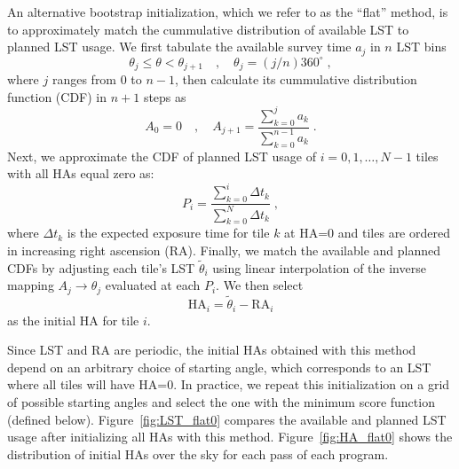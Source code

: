 \documentclass[12pt]{article}
\providecommand{\fig}[1]{Figure~\ref{fig:#1}}
\begin{document}
An alternative bootstrap initialization, which we refer to as the ``flat'' method, is to approximately match the cummulative distribution of available LST to planned LST usage. We first tabulate the available survey time $a_j$ in $n$ LST bins
$$
\theta_j \le \theta < \theta_{j+1} \quad , \quad \theta_j = (j/n) 360^\circ \; ,
$$
where $j$ ranges from $0$ to $n-1$, then calculate its cummulative distribution function (CDF) in $n+1$ steps as
$$
A_0 = 0 \quad , \quad
A_{j+1} = \frac{\sum_{k=0}^{j} a_k}{\sum_{k=0}^{n-1} a_k} \; .
$$
Next, we approximate the CDF of planned LST usage of $i = 0, 1, \ldots, N-1$ tiles with all HAs equal zero as:
$$
P_i = \frac{\sum_{k=0}^{i} \Delta t_k}{\sum_{k=0}^N \Delta t_k} \; ,
$$
where $\Delta t_k$ is the expected exposure time for tile $k$ at HA=0 and tiles are ordered in increasing right ascension (RA). Finally, we match the available and planned CDFs by adjusting each tile's LST $\tilde{\theta}_i$ using linear interpolation of the inverse mapping $A_j \rightarrow \theta_j$ evaluated at each $P_i$.  We then select
$$
\text{HA}_i = \tilde{\theta}_i - \text{RA}_i
$$
as the initial HA for tile $i$.

Since LST and RA are periodic, the initial HAs obtained with this method depend on an arbitrary choice of starting angle, which corresponds to an LST where all tiles will have HA=0. In practice, we repeat this initialization on a grid of possible starting angles and select the one with the minimum score function (defined below). \fig{LST_flat0} compares the available and planned LST usage after initializing all HAs with this method. \fig{HA_flat0} shows the distribution of initial HAs over the sky for each pass of each program.
\end{document}
